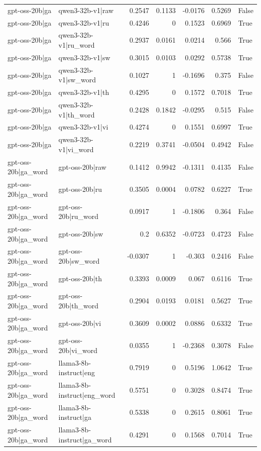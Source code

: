\begin{table}
\begin{tabular}{l l r r r r l}
gpt-oss-20b|ga & qwen3-32b-v1|raw & 0.2547 & 0.1133 & -0.0176 & 0.5269 & False \\
gpt-oss-20b|ga & qwen3-32b-v1|ru & 0.4246 & 0 & 0.1523 & 0.6969 & True \\
gpt-oss-20b|ga & qwen3-32b-v1|ru_word & 0.2937 & 0.0161 & 0.0214 & 0.566 & True \\
gpt-oss-20b|ga & qwen3-32b-v1|sw & 0.3015 & 0.0103 & 0.0292 & 0.5738 & True \\
gpt-oss-20b|ga & qwen3-32b-v1|sw_word & 0.1027 & 1 & -0.1696 & 0.375 & False \\
gpt-oss-20b|ga & qwen3-32b-v1|th & 0.4295 & 0 & 0.1572 & 0.7018 & True \\
gpt-oss-20b|ga & qwen3-32b-v1|th_word & 0.2428 & 0.1842 & -0.0295 & 0.515 & False \\
gpt-oss-20b|ga & qwen3-32b-v1|vi & 0.4274 & 0 & 0.1551 & 0.6997 & True \\
gpt-oss-20b|ga & qwen3-32b-v1|vi_word & 0.2219 & 0.3741 & -0.0504 & 0.4942 & False \\
gpt-oss-20b|ga_word & gpt-oss-20b|raw & 0.1412 & 0.9942 & -0.1311 & 0.4135 & False \\
gpt-oss-20b|ga_word & gpt-oss-20b|ru & 0.3505 & 0.0004 & 0.0782 & 0.6227 & True \\
gpt-oss-20b|ga_word & gpt-oss-20b|ru_word & 0.0917 & 1 & -0.1806 & 0.364 & False \\
gpt-oss-20b|ga_word & gpt-oss-20b|sw & 0.2 & 0.6352 & -0.0723 & 0.4723 & False \\
gpt-oss-20b|ga_word & gpt-oss-20b|sw_word & -0.0307 & 1 & -0.303 & 0.2416 & False \\
gpt-oss-20b|ga_word & gpt-oss-20b|th & 0.3393 & 0.0009 & 0.067 & 0.6116 & True \\
gpt-oss-20b|ga_word & gpt-oss-20b|th_word & 0.2904 & 0.0193 & 0.0181 & 0.5627 & True \\
gpt-oss-20b|ga_word & gpt-oss-20b|vi & 0.3609 & 0.0002 & 0.0886 & 0.6332 & True \\
gpt-oss-20b|ga_word & gpt-oss-20b|vi_word & 0.0355 & 1 & -0.2368 & 0.3078 & False \\
gpt-oss-20b|ga_word & llama3-8b-instruct|eng & 0.7919 & 0 & 0.5196 & 1.0642 & True \\
gpt-oss-20b|ga_word & llama3-8b-instruct|eng_word & 0.5751 & 0 & 0.3028 & 0.8474 & True \\
gpt-oss-20b|ga_word & llama3-8b-instruct|ga & 0.5338 & 0 & 0.2615 & 0.8061 & True \\
gpt-oss-20b|ga_word & llama3-8b-instruct|ga_word & 0.4291 & 0 & 0.1568 & 0.7014 & True \\

\end{tabular}
\end{table}
